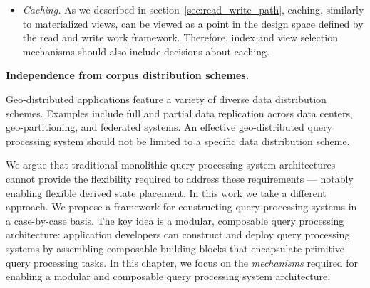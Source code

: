 \begin{itemize}
  \item \textit{Caching.}
  As we described in section~\ref{sec:read_write_path},
  caching, similarly to materialized views, can be viewed as a point in the design space defined by the read and write
  work framework.
  Therefore, index and view selection mechanisms should also include decisions about caching.

\end{itemize}

\medskip
\noindent
\textbf{Independence from corpus distribution schemes.}

\noindent
Geo-distributed applications feature a variety of diverse data distribution schemes.
Examples include full and partial data replication across data centers, geo-partitioning, and federated systems.
An effective geo-distributed query processing system should not be limited to a specific data distribution scheme.

\bigskip
\noindent
We argue that traditional monolithic query processing system architectures cannot provide the flexibility required
to address these requirements --- notably enabling flexible derived state placement.
In this work we take a different approach.
We propose a framework for constructing query processing systems in a case-by-case basis.
The key idea is a modular, composable query processing architecture:
application developers can construct and deploy query processing systems by assembling composable building blocks that
encapsulate primitive query processing tasks.
In this chapter,
we focus on the \textit{mechanisms} required for enabling a modular and composable query processing system architecture.




